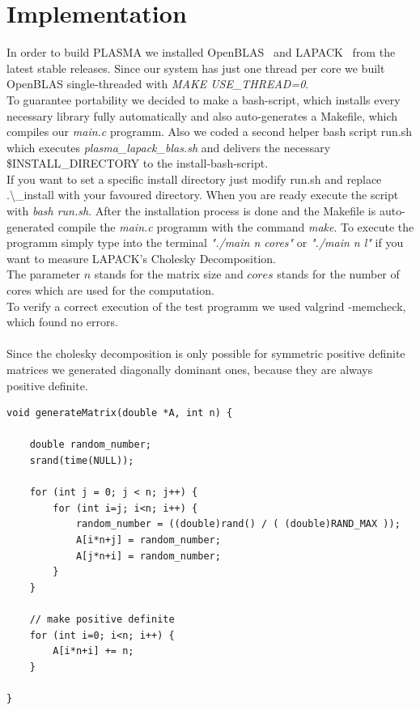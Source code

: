 \documentclass[a4paper,final,ngerman,english]{article}
\begin{document}
\section{Implementation}

In order to build PLASMA we installed OpenBLAS~\cite{openblas01} and LAPACK~\cite{lawn20} from the latest stable releases.
Since our system has just one thread per core we built OpenBLAS single-threaded with \textit{MAKE USE\_THREAD=0}.\\
To guarantee portability we decided to make a bash-script, which installs every necessary library fully automatically and also auto-generates a Makefile, which compiles our \textit{main.c} programm.
Also we coded a second helper bash script {run.sh} which executes \textit{plasma\_lapack\_blas.sh} and delivers the necessary \$INSTALL\_DIRECTORY to the install-bash-script.\\
If you want to set a specific install directory just modify run.sh and replace {.\textbackslash\_install} with your favoured directory.
When you are ready execute the script with \textit{bash run.sh}.
After the installation process is done and the Makefile is auto-generated compile the \textit{main.c} programm with the command \textit{make}.
To execute the programm simply type into the terminal \textit{"./main n cores"} or \textit{"./main n l"} if you want to measure LAPACK's Cholesky Decomposition.\\ The parameter $n$ stands for the matrix size and $cores$ stands for the number of cores which are used for the computation.\\
To verify a correct execution of the test programm we used valgrind -memcheck, which found no errors.\\
\ \\Since the cholesky decomposition is only possible for symmetric positive definite matrices we generated diagonally dominant ones, because they are always positive definite.
\begin{lstlisting}
void generateMatrix(double *A, int n) {

	double random_number;
	srand(time(NULL));

	for (int j = 0; j < n; j++) {
		for (int i=j; i<n; i++) {
			random_number = ((double)rand() / ( (double)RAND_MAX ));
			A[i*n+j] = random_number;
			A[j*n+i] = random_number;
		}
	}

	// make positive definite
	for (int i=0; i<n; i++) {
		A[i*n+i] += n;
	}

}
\end{lstlisting}
\end{document}
